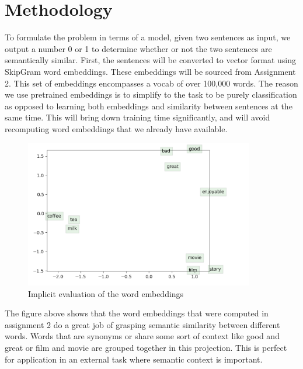 \documentclass{article}
\begin{document}
\section{Methodology}
To formulate the problem in terms of a model, given two sentences as input, we output a number 0 or 1 to determine whether or not the two sentences are semantically similar. First, the sentences will be converted to vector format using SkipGram word embeddings. These embeddings will be sourced from Assignment 2. This set of embeddings encompasses a vocab of over 100,000 words. The reason we use pretrained embeddings is to simplify to the task to be purely classification as opposed to learning both embeddings and similarity between sentences at the same time. This will bring down training time significantly, and will avoid recomputing word embeddings that we already have available.
\begin{figure}[htp]
    \centering
    \includegraphics[width=10cm]{embeddings.png}
    \caption{Implicit evaluation of the word embeddings}
\end{figure}

The figure above shows that the word embeddings that were computed in assignment 2 do a great job of grasping semantic similarity between different words. Words that are synonyms or share some sort of context like good and great or film and movie are grouped together in this projection. This is perfect for application in an external task where semantic context is important.
\end{document}
